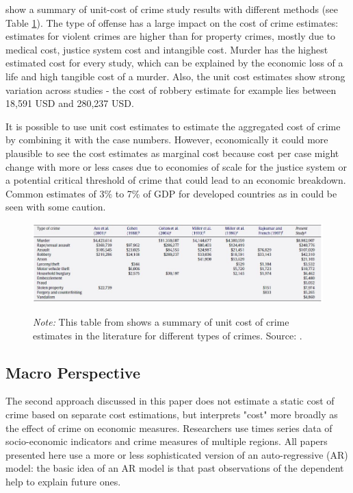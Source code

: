 \documentclass[a4paper,12pt]{article}
\begin{document}
\cite{collister} show a summary of unit-cost of crime study results with different methods (see Table \ref{fig:unit_cost_crime_lit_review}). 
The type of offense has a large impact on the cost of crime estimates: estimates for violent crimes are higher than for property crimes, mostly due to medical cost, justice system cost and intangible cost. Murder has the highest estimated cost for every study, which can be explained by the economic loss of a life and high tangible cost of a murder. 
Also, the unit cost estimates show strong variation across studies - the cost of robbery estimate for example lies between 18,591 USD and 280,237 USD. 

It is possible to use unit cost estimates to estimate the aggregated cost of crime by combining it with the case numbers. However, economically it could more plausible to see the cost estimates as marginal cost because cost per case might change with more or less cases due to economies of scale for the justice system or a potential critical threshold of crime that could lead to an economic breakdown. Common estimates of 3\% to 7\% of GDP for developed countries as in \citep{kosten_nutzen_entorf} could be seen with some caution. 

\begin{figure}
\begin{minipage}{0.9\textwidth}
  \includegraphics[trim={0 0 0 0},width=\linewidth]{charts/tab_lit_review.jpg}
\begin{flushleft}
\footnotesize{\textit{Note:} This table from \cite{collister} shows a summary of unit cost of crime estimates in the literature for different types of crimes. Source: \cite{collister}.
\label{fig:unit_cost_crime_lit_review}	
}
\end{flushleft}
\end{minipage}
\end{figure}

\subsection{Macro Perspective}
The second approach discussed in this paper does not estimate a static cost of crime based on separate cost estimations, but interprets "cost" more broadly as the effect of crime on economic measures. Researchers use times series data of socio-economic indicators and crime measures of multiple regions. All papers presented here use a more or less sophisticated version of an auto-regressive (AR) model: the basic idea of an AR model is that past observations of the dependent help to explain future ones. 
\end{document}
